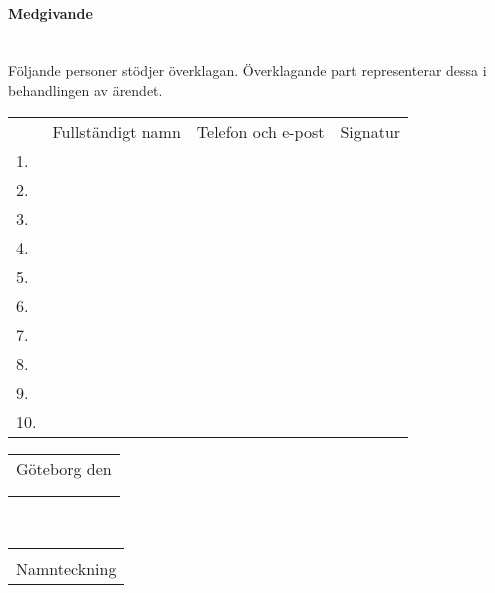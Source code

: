 \documentclass{dtek}
\begin{document}
\newpage

\paragraph{Medgivande} ~\\
Följande personer stödjer överklagan. Överklagande part representerar dessa i behandlingen av ärendet.\\
\begin{tabular}{l p{} p{} l}
 & Fullständigt namn & Telefon och e-post & Signatur\\
1. & \hrulefill & \hrulefill & \hrulefill \\
2. & \hrulefill & \hrulefill & \hrulefill \\
3. & \hrulefill & \hrulefill & \hrulefill \\
4. & \hrulefill & \hrulefill & \hrulefill \\
5. & \hrulefill & \hrulefill & \hrulefill \\
6. & \hrulefill & \hrulefill & \hrulefill \\
7. & \hrulefill & \hrulefill & \hrulefill \\
8. & \hrulefill & \hrulefill & \hrulefill \\
9. & \hrulefill & \hrulefill & \hrulefill \\
10. & \hrulefill & \hrulefill & \hrulefill \\
\end{tabular}
\vfill
\begin{tabular}{p{6cm}}
Göteborg den \hrulefill\\
\\
\\
\end{tabular}
\bigskip \\
\begin{tabular}{p{10cm}}\hrulefill\\
Namnteckning\\
\end{tabular}
\end{document}
